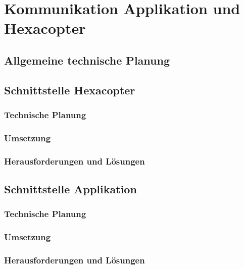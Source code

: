 \chapter{Kommunikation Applikation und Hexacopter}
\renewcommand{\kapitelautor}{Autor: Katharina Joksch, Lucas Ullrich}

\section{Allgemeine technische Planung}

\section{Schnittstelle Hexacopter}
\renewcommand{\kapitelautor}{Autor: Lucas Ullrich}

  \subsection{Technische Planung}

  \subsection{Umsetzung}

  \subsection{Herausforderungen und Lösungen}

\section{Schnittstelle Applikation}
\renewcommand{\kapitelautor}{Autor: Katharina Joksch}

  \subsection{Technische Planung}

  \subsection{Umsetzung}

  \subsection{Herausforderungen und Lösungen}
